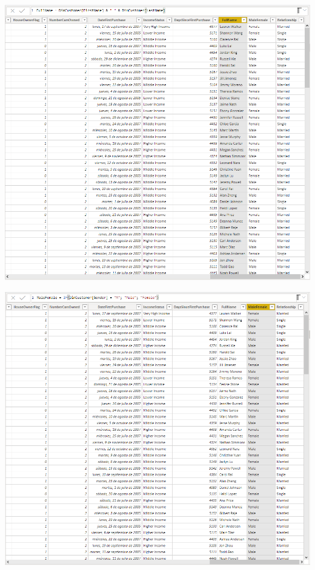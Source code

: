 \begin{center}
\includegraphics[width=20cm]{./Imagenes/CapturaNro05}
\end{center}

\begin{center}
\includegraphics[width=20cm]{./Imagenes/CapturaNro06}
\end{center}

